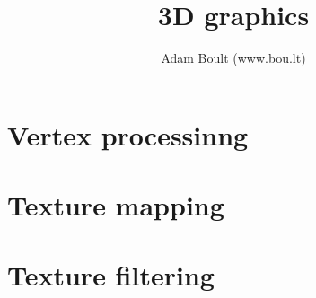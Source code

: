 \documentclass[oneside]{book}
\begin{document}
\author{Adam Boult (www.bou.lt)}
\title{3D graphics}
\maketitle

\setcounter{tocdepth}{0}
\tableofcontents



\part{Vertex processinng}



\part{Texture mapping}


\part{Texture filtering}

\end{document}
